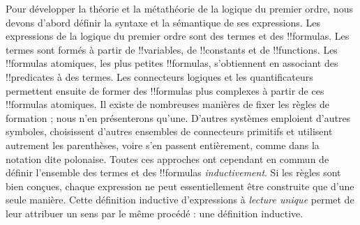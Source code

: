 \documentclass[../../../include/open-logic-section]{subfiles}
\begin{document}


Pour développer la théorie et la métathéorie de la logique du premier
ordre, nous devons d'abord définir la syntaxe et la sémantique de ses
expressions. Les expressions de la logique du premier ordre sont des
termes et des !!{formula}s. Les termes sont formés à partir de
!!{variable}s, de !!{constant}s et de !!{function}s. Les
!!{formula}s atomiques, les plus petites !!{formula}s, s'obtiennent
en associant des !!{predicate}s à des termes. Les connecteurs
logiques et les quantificateurs permettent ensuite de former
des !!{formula}s plus complexes à partir de ces !!{formula}s atomiques.
Il existe de nombreuses manières de fixer les règles de formation ;
nous n'en présenterons qu'une. D'autres systèmes emploient d'autres
symboles, choisissent d'autres ensembles de connecteurs primitifs et
utilisent autrement les parenthèses, voire s'en passent entièrement,
comme dans la notation dite polonaise. Toutes ces approches ont
cependant en commun de définir l'ensemble des termes et des
!!{formula}s \emph{inductivement}. Si les règles sont bien conçues,
chaque expression ne peut essentiellement être construite que d'une
seule manière. Cette définition inductive d'expressions à
\emph{lecture unique} permet de leur attribuer un sens par le même
procédé : une définition inductive.
\end{document}
